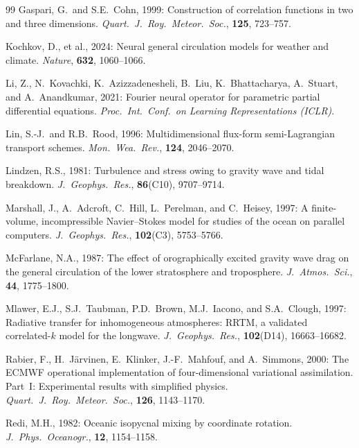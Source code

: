 \documentclass[11pt,a4paper]{article}
\begin{document}
\begin{thebibliography}{99}
Gaspari, G.\ and S.E.~Cohn, 1999:
Construction of correlation functions in two and three dimensions.
\textit{Quart.\ J.\ Roy.\ Meteor.\ Soc.}, \textbf{125}, 723--757.

Kochkov, D., et al., 2024:
Neural general circulation models for weather and climate.
\textit{Nature}, \textbf{632}, 1060--1066.

Li, Z., N.~Kovachki, K.~Azizzadenesheli, B.~Liu, K.~Bhattacharya, A.~Stuart,
and A.~Anandkumar, 2021:
Fourier neural operator for parametric partial differential equations.
\textit{Proc.\ Int.\ Conf.\ on Learning Representations (ICLR)}.

Lin, S.-J.\ and R.B.~Rood, 1996:
Multidimensional flux-form semi-Lagrangian transport schemes.
\textit{Mon.\ Wea.\ Rev.}, \textbf{124}, 2046--2070.

Lindzen, R.S., 1981:
Turbulence and stress owing to gravity wave and tidal breakdown.
\textit{J.\ Geophys.\ Res.}, \textbf{86}(C10), 9707--9714.

Marshall, J., A.~Adcroft, C.~Hill, L.~Perelman, and C.~Heisey, 1997:
A finite-volume, incompressible Navier--Stokes model for studies of the ocean
on parallel computers.
\textit{J.\ Geophys.\ Res.}, \textbf{102}(C3), 5753--5766.

McFarlane, N.A., 1987:
The effect of orographically excited gravity wave drag on the general
circulation of the lower stratosphere and troposphere.
\textit{J.\ Atmos.\ Sci.}, \textbf{44}, 1775--1800.

Mlawer, E.J., S.J.~Taubman, P.D.~Brown, M.J.~Iacono, and S.A.~Clough, 1997:
Radiative transfer for inhomogeneous atmospheres: RRTM, a validated
correlated-$k$ model for the longwave.
\textit{J.\ Geophys.\ Res.}, \textbf{102}(D14), 16663--16682.

Rabier, F., H.~J\"arvinen, E.~Klinker, J.-F.~Mahfouf, and A.~Simmons, 2000:
The ECMWF operational implementation of four-dimensional variational
assimilation. Part~I: Experimental results with simplified physics.
\textit{Quart.\ J.\ Roy.\ Meteor.\ Soc.}, \textbf{126}, 1143--1170.

Redi, M.H., 1982:
Oceanic isopycnal mixing by coordinate rotation.
\textit{J.\ Phys.\ Oceanogr.}, \textbf{12}, 1154--1158.


\end{thebibliography}
\end{document}
